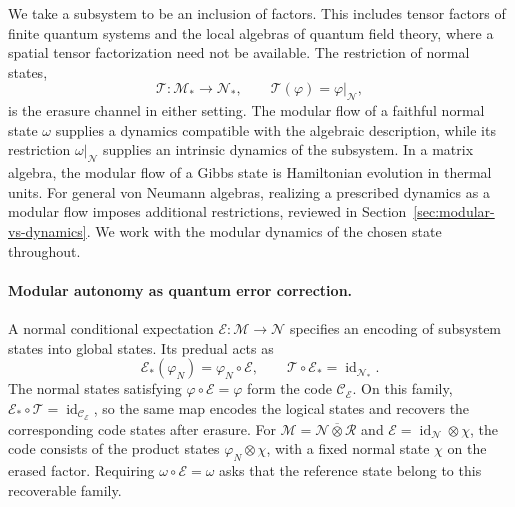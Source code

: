 \documentclass[a4paper,11pt]{article}
\theoremstyle{definition}
\begin{document}
We take a subsystem to be an inclusion of factors. This includes tensor factors of finite quantum systems and the local algebras of quantum field theory, where a spatial tensor factorization need not be available. The restriction of normal states,
\begin{equation}
 \mathcal T:\mathcal M_*\longrightarrow\mathcal N_*,
 \qquad \mathcal T(\varphi)=\varphi|_{\mathcal N},
\end{equation}
is the erasure channel in either setting. The modular flow of a faithful normal state $\omega$ supplies a dynamics compatible with the algebraic description, while its restriction $\omega|_{\mathcal N}$ supplies an intrinsic dynamics of the subsystem. In a matrix algebra, the modular flow of a Gibbs state is Hamiltonian evolution in thermal units. For general von Neumann algebras, realizing a prescribed dynamics as a modular flow imposes additional restrictions, reviewed in Section~\ref{sec:modular-vs-dynamics}. We work with the modular dynamics of the chosen state throughout.

\paragraph{Modular autonomy as quantum error correction.}
A normal conditional expectation $\mathcal E:\mathcal M\to\mathcal N$ specifies an encoding of subsystem states into global states. Its predual acts as
\begin{equation}
 \mathcal E_*(\varphi_N)=\varphi_N\circ\mathcal E,
 \qquad
 \mathcal T\circ\mathcal E_*=\operatorname{id}_{\mathcal N_*}.
\end{equation}
The normal states satisfying $\varphi\circ\mathcal E=\varphi$ form the code $\mathcal C_{\mathcal E}$. On this family, $\mathcal E_*\circ\mathcal T=\operatorname{id}_{\mathcal C_{\mathcal E}}$, so the same map encodes the logical states and recovers the corresponding code states after erasure. For $\mathcal M=\mathcal N\overline\otimes\mathcal R$ and $\mathcal E=\operatorname{id}_{\mathcal N}\otimes\chi$, the code consists of the product states $\varphi_N\otimes\chi$, with a fixed normal state $\chi$ on the erased factor. Requiring $\omega\circ\mathcal E=\omega$ asks that the reference state belong to this recoverable family.
\end{document}
